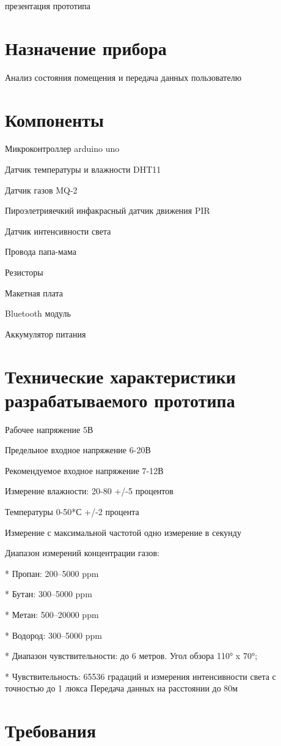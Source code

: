\documentclass[12pt,a4paper]{scrartcl}
\begin{document}
 	{презентация прототипа }
 	
 	\section{Назначение прибора}
 	Анализ состояния помещения и передача данных пользователю
 	\section{Компоненты}
 	Микроконтроллер arduino uno
 	
 	Датчик температуры и влажности DHT11
 	
 	Датчик газов MQ-2
 	
 	Пироэлетрияечкий инфакрасный датчик движения PIR
 	
 	Датчик интенсивности света
 	
 	Провода папа-мама
 	
 	Резисторы
 	
 	Макетная плата
 	
 	Bluetooth модуль
 	
 	Аккумулятор питания
 	\section{Технические характеристики разрабатываемого прототипа}
 	
 	Рабочее напряжение 5В
 	
 	Предельное входное напряжение 6-20В
 	
 	Рекомендуемое входное напряжение 7-12В
 	
 	Измерение влажности: 20-80 +/-5 процентов
 	
 	Температуры 0-50*С +/-2 процента
 	
 	Измерение с максимальной частотой одно измерение в секунду
 	
 	Диапазон измерений концентрации газов:
 	
 	* Пропан: 200–5000 ppm
 	
 	* Бутан: 300–5000 ppm
 	
 	* Метан: 500–20000 ppm
 	
 	* Водород: 300–5000 ppm
 	
 	* Диапазон чувствительности: до 6 метров. Угол обзора 110° x 70°;
 	
 	* Чувствительность: 65536 градаций и измерения интенсивности света с точностью до 1 люкса
 	Передача данных на расстоянии до 80м
 	\section{Требования}
\end{document}
